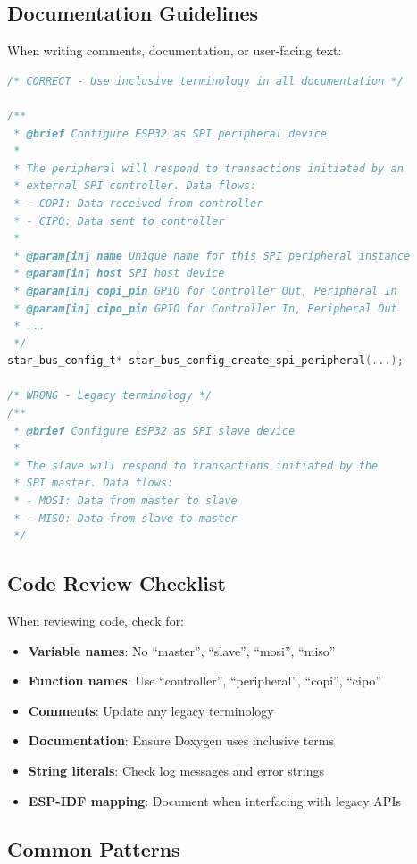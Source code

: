 \subsection{Documentation Guidelines}

When writing comments, documentation, or user-facing text:

\begin{lstlisting}[language=C]
/* CORRECT - Use inclusive terminology in all documentation */

/**
 * @brief Configure ESP32 as SPI peripheral device
 *
 * The peripheral will respond to transactions initiated by an
 * external SPI controller. Data flows:
 * - COPI: Data received from controller
 * - CIPO: Data sent to controller
 *
 * @param[in] name Unique name for this SPI peripheral instance
 * @param[in] host SPI host device
 * @param[in] copi_pin GPIO for Controller Out, Peripheral In
 * @param[in] cipo_pin GPIO for Controller In, Peripheral Out
 * ...
 */
star_bus_config_t* star_bus_config_create_spi_peripheral(...);

/* WRONG - Legacy terminology */
/**
 * @brief Configure ESP32 as SPI slave device
 *
 * The slave will respond to transactions initiated by the
 * SPI master. Data flows:
 * - MOSI: Data from master to slave
 * - MISO: Data from slave to master
 */
\end{lstlisting}

\subsection{Code Review Checklist}

When reviewing code, check for:

\begin{itemize}
    \item \textbf{Variable names}: No ``master'', ``slave'', ``mosi'', ``miso''
    \item \textbf{Function names}: Use ``controller'', ``peripheral'', ``copi'', ``cipo''
    \item \textbf{Comments}: Update any legacy terminology
    \item \textbf{Documentation}: Ensure Doxygen uses inclusive terms
    \item \textbf{String literals}: Check log messages and error strings
    \item \textbf{ESP-IDF mapping}: Document when interfacing with legacy APIs
\end{itemize}

\subsection{Common Patterns}

